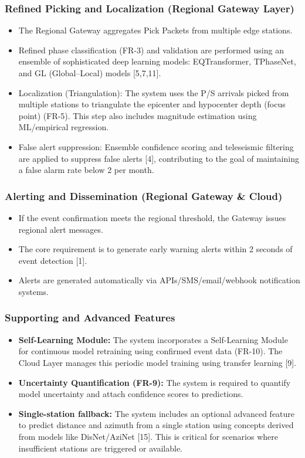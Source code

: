 \documentclass[a4paper,12pt]{report}
\begin{document}
\subsubsection{Refined Picking and Localization (Regional Gateway Layer)}
\begin{itemize}
\item The Regional Gateway aggregates Pick Packets from multiple edge stations.
\item Refined phase classification (FR-3) and validation are performed using an ensemble of sophisticated deep learning models: EQTransformer, TPhaseNet, and GL (Global--Local) models [5,7,11].
\item Localization (Triangulation): The system uses the P/S arrivals picked from multiple stations to triangulate the epicenter and hypocenter depth (focus point) (FR-5). This step also includes magnitude estimation using ML/empirical regression.
\item False alert suppression: Ensemble confidence scoring and teleseismic filtering are applied to suppress false alerts [4], contributing to the goal of maintaining a false alarm rate below 2 per month.
\end{itemize}

\subsubsection{Alerting and Dissemination (Regional Gateway \& Cloud)}
\begin{itemize}
\item If the event confirmation meets the regional threshold, the Gateway issues regional alert messages.
\item The core requirement is to generate early warning alerts within 2 seconds of event detection [1].
\item Alerts are generated automatically via APIs/SMS/email/webhook notification systems.
\end{itemize}

\subsubsection{Supporting and Advanced Features}
\begin{itemize}
\item \textbf{Self-Learning Module:} The system incorporates a Self-Learning Module for continuous model retraining using confirmed event data (FR-10). The Cloud Layer manages this periodic model training using transfer learning [9].
\item \textbf{Uncertainty Quantification (FR-9):} The system is required to quantify model uncertainty and attach confidence scores to predictions.
\item \textbf{Single-station fallback:} The system includes an optional advanced feature to predict distance and azimuth from a single station using concepts derived from models like DisNet/AziNet [15]. This is critical for scenarios where insufficient stations are triggered or available.
\end{itemize}
\end{document}
